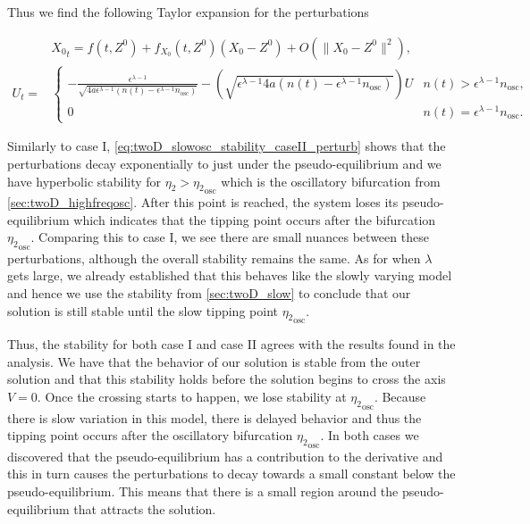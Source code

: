 Thus we find the following Taylor expansion for the perturbations

\begin{equation}\label{eq:twoD_slowosc_stability_caseII_perturb}
\begin{aligned}
&{X_0}_t = f(t,Z^0)+f_{X_0}(t,Z^0)(X_0-Z^0)+O(\lVert X_0-Z^0 \rVert^2),\\
U_t = & \begin{cases}
-\frac{\epsilon^{\lambda-1}}{\sqrt{4a\epsilon^{\lambda-1}(n(t)-\epsilon^{\lambda-1}n_{\text{osc}})}}-\left(\sqrt{\epsilon^{\lambda-1}4a(n(t)-\epsilon^{\lambda-1}n_{\text{osc}})}\right) U & n(t)>\epsilon^{\lambda-1}n_{\text{osc}},\\
0 & n(t)=\epsilon^{\lambda-1}n_{\text{osc}}.
\end{cases}
\end{aligned}
\end{equation}

\indent Similarly to case I, \eqref{eq:twoD_slowosc_stability_caseII_perturb} shows that the perturbations decay exponentially to just under the pseudo-equilibrium and we have hyperbolic stability for $\eta_2>{\eta_2}_{\text{osc}}$ which is the oscillatory bifurcation from \autoref{sec:twoD_highfreqosc}. After this point is reached, the system loses its pseudo-equilibrium which indicates that the tipping point occurs after the bifurcation ${\eta_2}_{\text{osc}}$. Comparing this to case I, we see there are small nuances between these perturbations, although the overall stability remains the same. As for when $\lambda$ gets large, we already established that this behaves like the slowly varying model and hence we use the stability from \autoref{sec:twoD_slow} to conclude that our solution is still stable until the slow tipping point ${\eta_2}_{\text{osc}}$.


\indent Thus, the stability for both case I and case II agrees with the results found in the analysis. We have that the behavior of our solution is stable from the outer solution and that this stability holds before the solution begins to cross the axis $V=0$. Once the crossing starts to happen, we lose stability at ${\eta_2}_{\text{osc}}$. Because there is slow variation in this model, there is delayed behavior and thus the tipping point occurs after the oscillatory bifurcation ${\eta_2}_{\text{osc}}$. In both cases we discovered that the pseudo-equilibrium has a contribution to the derivative and this in turn causes the perturbations to decay towards a small constant below the pseudo-equilibrium. This means that there is a small region around the pseudo-equilibrium that attracts the solution.
